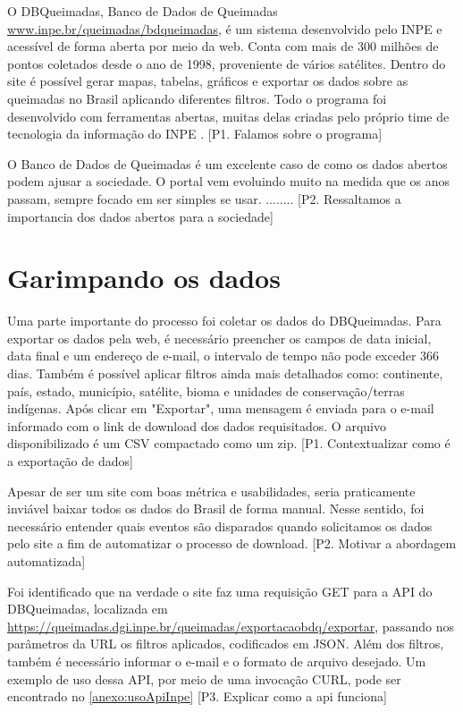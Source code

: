 \documentclass[cic,tc]{iiufrgs}
\begin{document}
O DBQueimadas, Banco de Dados de Queimadas \url{www.inpe.br/queimadas/bdqueimadas},
é um sistema desenvolvido pelo INPE e acessível de forma aberta por meio da web. 
Conta com mais de 300 milhões de pontos coletados desde o ano de 1998, 
proveniente de vários satélites. Dentro do site é possível gerar mapas,
tabelas, gráficos e exportar os dados sobre as queimadas no Brasil 
aplicando diferentes filtros. Todo o 
programa foi desenvolvido com ferramentas abertas, muitas delas 
criadas pelo próprio time de tecnologia da informação do INPE 
\citep{setzer2019banco}. [P1. Falamos sobre o programa] \par

O Banco de Dados de Queimadas é um excelente caso de como os dados abertos podem 
ajusar a sociedade. O portal vem evoluindo muito na medida que os anos passam, 
sempre focado em ser simples se usar. ........
[P2. Ressaltamos a importancia dos dados abertos para a sociedade] \par

\section{Garimpando os dados}

Uma parte importante do processo foi coletar os dados do DBQueimadas. 
Para exportar os dados pela web, é necessário preencher os campos de data inicial,
data final e um endereço de e-mail, o intervalo de tempo não 
pode exceder 366 dias. Também é possível aplicar filtros ainda mais 
detalhados como: continente, país, estado, município, satélite, bioma e 
unidades de conservação/terras indígenas. Após clicar em "Exportar", 
uma mensagem é enviada para o e-mail informado com o link de download 
dos dados requisitados. O arquivo disponibilizado é um CSV compactado 
como um zip. [P1. Contextualizar como é a exportação de dados]\par

Apesar de ser um site com boas métrica e usabilidades, seria praticamente 
inviável baixar todos os dados do Brasil de forma manual. Nesse sentido, 
foi necessário entender quais eventos são disparados quando solicitamos 
os dados pelo site a fim de automatizar o processo de download. 
[P2. Motivar a abordagem automatizada] \par

Foi identificado que na verdade o site faz uma requisição GET para a API do 
DBQueimadas, localizada em 
\url{https://queimadas.dgi.inpe.br/queimadas/exportacaobdq/exportar}, 
passando nos parâmetros da URL os filtros aplicados, codificados em JSON.
Além dos filtros, também é necessário informar o e-mail e o formato de arquivo
desejado. Um exemplo de uso dessa API, por meio de uma invocação CURL, pode 
ser encontrado no \ref{anexo:usoApiInpe} [P3. Explicar como a api funciona]
\end{document}
